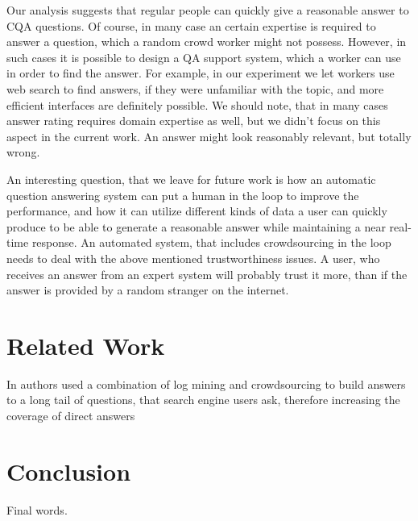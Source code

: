 \documentclass[11pt,letterpaper]{article}
\begin{document}
Our analysis suggests that regular people can quickly give a reasonable answer to CQA questions.
Of course, in many case an certain expertise is required to answer a question, which a random crowd worker might not possess.
However, in such cases it is possible to design a QA support system, which a worker can use in order to find the answer.
For example, in our experiment we let workers use web search to find answers, if they were unfamiliar with the topic, and more efficient interfaces are definitely possible.
We should note, that in many cases answer rating requires domain expertise as well, but we didn't focus on this aspect in the current work.
An answer might look reasonably relevant, but totally wrong.

An interesting question, that we leave for future work is how an automatic question answering system can put a human in the loop to improve the performance, and how it can utilize different kinds of data a user can quickly produce to be able to generate a reasonable answer while maintaining a near real-time response.
An automated system, that includes crowdsourcing in the loop needs to deal with the above mentioned trustworthiness issues.
A user, who receives an answer from an expert system will probably trust it more, than if the answer is provided by a random stranger on the internet.


\section{Related Work}
\label{sec:related_work}

In \cite{bernstein2012direct} authors used a combination of log mining and crowdsourcing to build answers to a long tail of questions, that search engine users ask, therefore increasing the coverage of direct answers

\section{Conclusion}
\label{sec:conclusion}

Final words.




\end{document}
